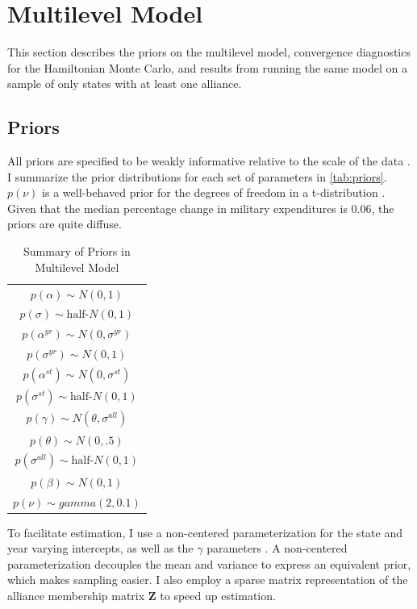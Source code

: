 \documentclass[12pt]{article}
\begin{document}
\section{Multilevel Model}

This section describes the priors on the multilevel model, convergence diagnostics for the Hamiltonian Monte Carlo, and results from running the same model on a sample of only states with at least one alliance. 

\subsection{Priors} 

All priors are specified to be weakly informative relative to the scale of the data \citep{Gelmanetal2017}. 
I summarize the prior distributions for each set of parameters in \autoref{tab:priors}. 
$p(\nu)$ is a well-behaved prior for the degrees of freedom in a t-distribution \citep{JuarezSteele2010}. 
Given that the median percentage change in military expenditures is 0.06, the priors are quite diffuse. 


\begin{table} %
\begin{center}
\begin{tabular}{c} 
$ p(\alpha) \sim N(0, 1)$  \\
$ p(\sigma) \sim \mbox{half-}N(0, 1) $ \\
$ p(\alpha^{yr}) \sim N(0, \sigma^{yr}) $ \\ 
$ p(\sigma^{yr}) \sim N(0, 1) $ \\
$ p(\alpha^{st}) \sim N(0, \sigma^{st}) $ \\ 
$ p(\sigma^{st}) \sim \mbox{half-}N(0, 1) $ \\ 
$ p(\gamma) \sim N(\theta, \sigma^{all}) $ \\ 
$ p(\theta) \sim N(0, .5) $ \\
$ p(\sigma^{all}) \sim \mbox{half-}N(0, 1) $ \\
$ p(\beta) \sim N(0, 1) $ \\
$ p(\nu) \sim gamma(2, 0.1)$ 
\end{tabular} 
\caption{Summary of Priors in Multilevel Model} 
\label{tab:priors}
\end{center} 
\end{table} 


To facilitate estimation, I use a non-centered parameterization for the state and year varying intercepts, as well as the $\gamma$ parameters \citep{BetancourtGirolani2015}. 
A non-centered parameterization decouples the mean and variance to express an equivalent prior, which makes sampling easier. 
I also employ a sparse matrix representation of the alliance membership matrix $\textbf{Z}$ to speed up estimation. 
\end{document}
